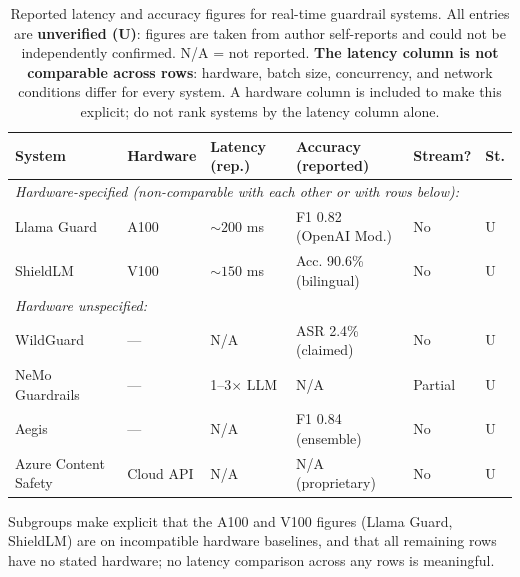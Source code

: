\begin{table}[t]
  \caption{Reported latency and accuracy figures for real-time guardrail systems.
           All entries are \textbf{unverified (U)}: figures are taken from author
           self-reports and could not be independently confirmed.
           N/A = not reported.
           \textbf{The latency column is not comparable across rows}: hardware,
           batch size, concurrency, and network conditions differ for every system.
           A hardware column is included to make this explicit; do not rank systems
           by the latency column alone.}
  \label{tab:latency}
  \centering
  \small
  \begin{tabular}{p{2.5cm}p{1.8cm}p{2.4cm}p{3.4cm}p{1.5cm}p{0.8cm}}
    \toprule
    \textbf{System} & \textbf{Hardware} & \textbf{Latency (rep.)} & \textbf{Accuracy (reported)} & \textbf{Stream?} & \textbf{St.} \\
    \midrule
    \multicolumn{6}{l}{\textit{Hardware-specified (non-comparable with each other or with rows below):}} \\
    Llama Guard~\cite{inan2023llama}       & A100        & ${\sim}200$ ms   & F1 0.82 (OpenAI Mod.)    & No      & U \\
    ShieldLM~\cite{zhang2024shieldlm}      & V100        & ${\sim}150$ ms   & Acc. 90.6\% (bilingual)  & No      & U \\
    \midrule
    \multicolumn{6}{l}{\textit{Hardware unspecified:}} \\
    WildGuard~\cite{han2024wildguard}      & ---         & N/A              & ASR 2.4\% (claimed)      & No      & U \\
    NeMo Guardrails~\cite{rebedea2023nemo} & ---         & 1--3$\times$ LLM & N/A                      & Partial & U \\
    Aegis~\cite{su2024aegis}               & ---         & N/A              & F1 0.84 (ensemble)       & No      & U \\
    Azure Content Safety~\cite{azure2024contentsafety} & Cloud API & N/A   & N/A (proprietary)        & No      & U \\
    \bottomrule
  \end{tabular}
  \par\smallskip
  \noindent\small Subgroups make explicit that the A100 and V100 figures
  (Llama Guard, ShieldLM) are on incompatible hardware baselines, and that all
  remaining rows have no stated hardware; no latency comparison across any rows
  is meaningful.
\end{table}

